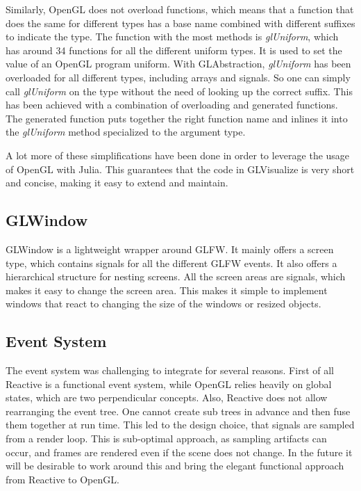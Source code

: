 Similarly, OpenGL does not overload functions, which means that a function that does the same for different types has a base name combined with different suffixes to indicate the type.
The function with the most methods is \textit{glUniform}, which has around 34 functions for all the different uniform types. 
It is used to set the value of an \ac{OpenGL} program uniform.
With GLAbstraction, \textit{glUniform} has been overloaded for all different types, including arrays and signals. So one can simply call \textit{glUniform} on the type without the need of looking up the correct suffix.
This has been achieved with a combination of overloading and generated functions.
The generated function puts together the right function name and inlines it into the \textit{glUniform} method specialized to the argument type.

A lot more of these simplifications have been done in order to leverage the usage of OpenGL with Julia.
This guarantees that the code in GLVisualize is very short and concise, making it easy to extend and maintain.

\subsection{GLWindow}
GLWindow is a lightweight wrapper around GLFW.
It mainly offers a screen type, which contains signals for all the different GLFW events. 
It also offers a hierarchical structure for nesting screens.
All the screen areas are signals, which makes it easy to change the screen area. 
This makes it simple to implement windows that react to changing the size of the windows or resized objects.


\subsection{Event System}

The event system was challenging to integrate for several reasons.
First of all Reactive is a functional event system, while \ac{OpenGL} relies heavily on global states, which are two perpendicular concepts.
Also, Reactive does not allow rearranging the event tree. 
One cannot create sub trees in advance and then fuse them together at run time.
This led to the design choice, that signals are sampled from a render loop.
This is sub-optimal approach, as sampling artifacts can occur, and frames are rendered even if the scene does not change.
In the future it will be desirable to work around this and bring the elegant functional approach from Reactive to OpenGL.


